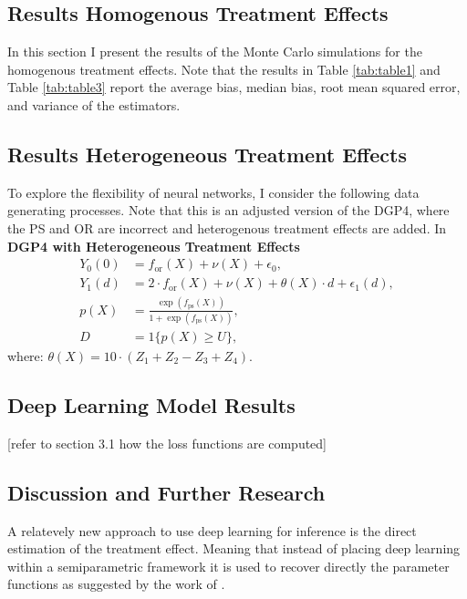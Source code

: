 \subsection{Results Homogenous Treatment Effects}



In this section I present the results of the Monte Carlo simulations for the homogenous treatment effects.
Note that the results in Table \ref{tab:table1}  and Table \ref{tab:table3} report the average bias, median bias, root mean squared error, and variance of the estimators.




\subsection{Results Heterogeneous Treatment Effects}
To explore the flexibility of neural networks, I consider the following data generating processes. Note that this is an adjusted version of the DGP4, where the PS and OR are incorrect and heterogenous treatment effects are added. In \\
\textbf{DGP4 with Heterogeneous Treatment Effects}
\begin{align*}
    Y_0(0) &= f_{\text{or}}(X) + \nu(X) + \epsilon_0, \\
    Y_1(d) &= 2 \cdot f_{\text{or}}(X) + \nu(X) + \theta(X) \cdot d + \epsilon_1(d), \\
    p(X) &= \frac{\exp \left( f_{\text{ps}}(X) \right)}{1 + \exp \left( f_{\text{ps}}(X) \right)}, \\
    D &= 1\{ p(X) \geq U \},
\end{align*}
where: $\theta(X) = 10 \cdot (Z_1 + Z_2 - Z_3 + Z_4)$.



\subsection{Deep Learning Model Results}
[refer to section 3.1 how the loss functions are computed]




\subsection{Discussion and Further Research}


A relatevely new approach to use deep learning for inference is the direct estimation of the treatment effect.
Meaning that instead of placing deep learning within a semiparametric framework it is used to recover directly the parameter functions as suggested by the work of \citet{DeepLearningIndividual2021}.
